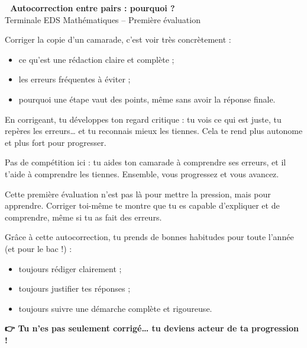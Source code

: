 \documentclass[a4paper, 12pt]{article}
\begin{document}
\begin{center}
    {\Huge\bfseries 🌟 Autocorrection entre pairs : pourquoi ? 🌟}\\[1cm]
    {\Large Terminale EDS Mathématiques – Première évaluation}
\end{center}

\vspace{0.8cm}

\begin{tcolorbox}[colback=blue!5, colframe=blue!70!black, title=\textbf{1. Comprendre ce qui est attendu}]
Corriger la copie d’un camarade, c’est voir très concrètement :
\begin{itemize}[leftmargin=*]
    \item ce qu’est une rédaction claire et complète ;
    \item les erreurs fréquentes à éviter ;
    \item pourquoi une étape vaut des points, même sans avoir la réponse finale.
\end{itemize}
\end{tcolorbox}

\begin{tcolorbox}[colback=green!5, colframe=green!60!black, title=\textbf{2. Apprendre à s’auto-évaluer}]
En corrigeant, tu développes ton regard critique : tu vois ce qui est juste, tu repères les erreurs… et tu reconnais mieux les tiennes. Cela te rend plus autonome et plus fort pour progresser.
\end{tcolorbox}

\begin{tcolorbox}[colback=orange!5, colframe=orange!80!black, title=\textbf{3. Coopérer plutôt que rivaliser}]
Pas de compétition ici : tu aides ton camarade à comprendre ses erreurs, et il t’aide à comprendre les tiennes. Ensemble, vous progressez et vous avancez.
\end{tcolorbox}

\begin{tcolorbox}[colback=purple!5, colframe=purple!70!black, title=\textbf{4. Gagner en confiance}]
Cette première évaluation n’est pas là pour mettre la pression, mais pour apprendre. Corriger toi-même te montre que tu es capable d’expliquer et de comprendre, même si tu as fait des erreurs.
\end{tcolorbox}

\begin{tcolorbox}[colback=red!5, colframe=red!70!black, title=\textbf{5. Construire de bonnes habitudes}]
Grâce à cette autocorrection, tu prends de bonnes habitudes pour toute l’année (et pour le bac !) :
\begin{itemize}[leftmargin=*]
    \item toujours rédiger clairement ;
    \item toujours justifier tes réponses ;
    \item toujours suivre une démarche complète et rigoureuse.
\end{itemize}
\end{tcolorbox}

\vspace{0.8cm}

\begin{center}
    {\LARGE\bfseries 👉 Tu n’es pas seulement corrigé… tu deviens acteur de ta progression !}
\end{center}
\end{document}
